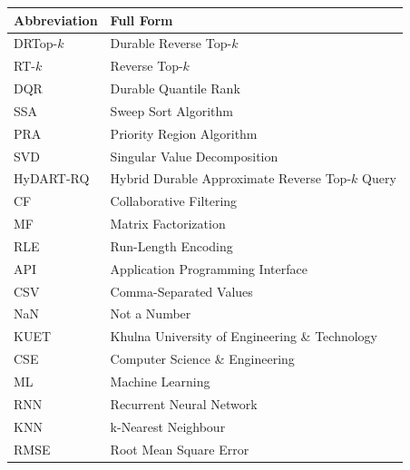 \documentclass[
  12pt,
  english,
  oneside,
]{report}
\begin{document}
\begin{tabular}{ll}
\toprule
\textbf{Abbreviation} & \textbf{Full Form} \\
\midrule
DRTop-$k$ & Durable Reverse Top-$k$ \\
RT-$k$    & Reverse Top-$k$ \\
DQR       & Durable Quantile Rank \\
SSA       & Sweep Sort Algorithm \\
PRA       & Priority Region Algorithm \\
SVD       & Singular Value Decomposition \\
HyDART-RQ & Hybrid Durable Approximate Reverse Top-$k$ Query \\
CF        & Collaborative Filtering \\
MF        & Matrix Factorization \\
RLE       & Run-Length Encoding \\
API       & Application Programming Interface \\
CSV       & Comma-Separated Values \\
NaN       & Not a Number \\
KUET      & Khulna University of Engineering \& Technology \\
CSE       & Computer Science \& Engineering \\
ML        & Machine Learning \\
RNN       & Recurrent Neural Network \\
KNN       & k-Nearest Neighbour \\
RMSE      & Root Mean Square Error \\
\bottomrule
\end{tabular}

\mainmatter
\pagestyle{fancy}









\printbibliography[heading=bibintoc, title={References}]

\appendix


\end{document}
